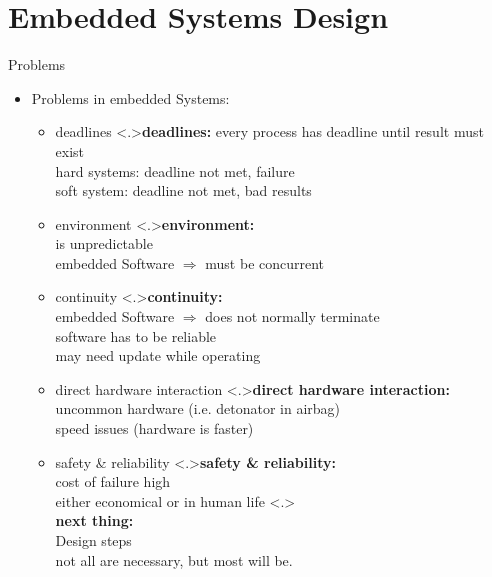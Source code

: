 \documentclass[ngerman={babel}, utf8, bigger, xcolor={table,dvipsnames}, ompress, hyperref={bookmarks,colorlinks}]{beamer}
\begin{document}
\section{Embedded Systems Design}
\begin{frame}{Problems}
	\begin{itemize}
		\item Problems in embedded Systems:
		\begin{itemize}
			\item deadlines
			\note<.>{\textbf{deadlines:} every process has deadline until result must exist \\ hard systems: deadline not met, failure\\ soft system: deadline not met, bad results}
			\item environment
			\note<.>{\textbf{environment:}\\ is unpredictable \\ embedded Software $\Rightarrow$ must be concurrent}
			\item continuity
			\note<.>{\textbf{continuity:}\\ embedded Software $\Rightarrow$ does not normally terminate \\ software has to be reliable \\ may need update while operating}
			\item direct hardware interaction
			\note<.>{\textbf{direct hardware interaction:}\\ uncommon hardware (i.e. detonator in airbag) \\ speed issues (hardware is faster)}
			\item safety \& reliability
			\note<.>{\textbf{safety \& reliability:}\\ cost of failure high \\ either economical or in human life}
			\note<.>{\\ \vspace{2em}\textbf{next thing:}\\Design steps \\ not all are necessary, but most will be.}
		\end{itemize}
	\end{itemize}
\end{frame}
\end{document}
